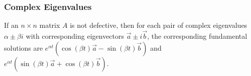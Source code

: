 \subsubsection{Complex Eigenvalues}
\begin{theorem}
	If an $n \times n$ matrix $A$ is not defective, then for each pair of complex eigenvalues $\alpha \pm \beta i$ with corresponding eigenvectors $\vec{a} \pm i\vec{b}$, the corresponding fundamental solutions are $e^{\alpha t}\left(\cos{(\beta t)}\vec{a}-\sin{(\beta t)\vec{b}}\right)$ and $e^{\alpha t}\left(\sin{(\beta t)}\vec{a}+\cos{(\beta t)\vec{b}}\right)$.
\end{theorem}

\ifodd{}\fi